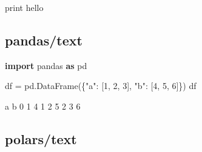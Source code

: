 \documentclass[
  a4paper,
  jafontscale=0.92,
  hanging_punctuation,
  head_space=24.8mm,
  foot_space=24.8mm]{jlreq}
\newenvironment{Shaded}{}{}
\newcommand{\DecValTok}[1]{\textcolor[rgb]{0.25,0.63,0.44}{#1}}
\newcommand{\ImportTok}[1]{\textcolor[rgb]{0.00,0.50,0.00}{\textbf{#1}}}
\newcommand{\NormalTok}[1]{#1}
\newcommand{\OperatorTok}[1]{\textcolor[rgb]{0.40,0.40,0.40}{#1}}
\newcommand{\StringTok}[1]{\textcolor[rgb]{0.25,0.44,0.63}{#1}}
\begin{document}
\vspace{-0.5\baselineskip}


\begin{Shaded}
\begin{Highlighting}[]
\NormalTok{print}
\NormalTok{\textquotesingle{}hello\textquotesingle{}}
\end{Highlighting}
\end{Shaded}

\subsection{pandas/text}\label{pandastext}


\begin{Shaded}
\begin{Highlighting}[]
\ImportTok{import}\NormalTok{ pandas }\ImportTok{as}\NormalTok{ pd}

\NormalTok{df }\OperatorTok{=}\NormalTok{ pd.DataFrame(\{}\StringTok{"a"}\NormalTok{: [}\DecValTok{1}\NormalTok{, }\DecValTok{2}\NormalTok{, }\DecValTok{3}\NormalTok{], }\StringTok{"b"}\NormalTok{: [}\DecValTok{4}\NormalTok{, }\DecValTok{5}\NormalTok{, }\DecValTok{6}\NormalTok{]\})}
\NormalTok{df}
\end{Highlighting}
\end{Shaded}

\vspace{-0.5\baselineskip}


\begin{Shaded}
\begin{Highlighting}[]
\NormalTok{   a  b}
\NormalTok{0  1  4}
\NormalTok{1  2  5}
\NormalTok{2  3  6}
\end{Highlighting}
\end{Shaded}

\subsection{polars/text}\label{polarstext}
\end{document}
